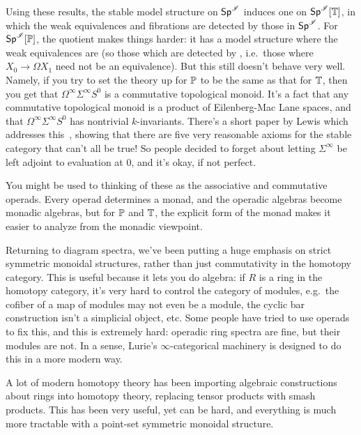 Using these results, the stable model structure on $\Spc^\sI$ induces one on $\Spc^\sI[\T]$, in which the weak
equivalences and fibrations are detected by those in $\Spc^\sI$. For $\Spc^\sI[\P]$, the quotient makes things
harder: it has a model structure where the weak equivalences are  (so those which are
detected by , i.e.\ those where $X_0\to\Omega X_1$ need not be an equivalence). But
this still doesn't behave very well. Namely, if you try to set the theory up for $\P$ to be the same as that for
$\T$, then you get that $\Omega^\infty\Sigma^\infty S^0$ is a commutative topological monoid. It's a fact that any
commutative topological monoid is a product of Eilenberg-Mac Lane spaces, and that $\Omega^\infty\Sigma^\infty S^0$
has nontrivial $k$-invariants. There's a short paper by Lewis which addresses this~\cite{Lewis91}, showing that
there are five very reasonable axioms for the stable category that can't all be true! So people decided to forget
about letting $\Sigma^\infty$ be left adjoint to evaluation at $0$, and it's okay, if not perfect.
\begin{rem}
You might be used to thinking of these as the associative and commutative operads. Every operad determines a monad,
and the operadic algebras become monadic algebras, but for $\P$ and $\T$, the explicit form of the monad makes it
easier to analyze from the monadic viewpoint.
\end{rem}
Returning to diagram spectra, we've been putting a huge emphasis on strict symmetric monoidal structures, rather
than just commutativity in the homotopy category. This is useful because it lets you do algebra: if $R$ is a ring
in the homotopy category, it's very hard to control the category of modules, e.g.\ the cofiber of a map of modules
may not even be a module, the cyclic bar construction isn't a simplicial object, etc. Some people have tried to use
operads to fix this, and this is extremely hard: operadic ring spectra are fine, but their modules are not. In a
sense, Lurie's $\infty$-categorical machinery is designed to do this in a more modern way.

A lot of modern homotopy theory has been importing algebraic constructions about rings into homotopy theory,
replacing tensor products with smash products. This has been very useful, yet can be hard, and everything is much
more tractable with a point-set symmetric monoidal structure.
